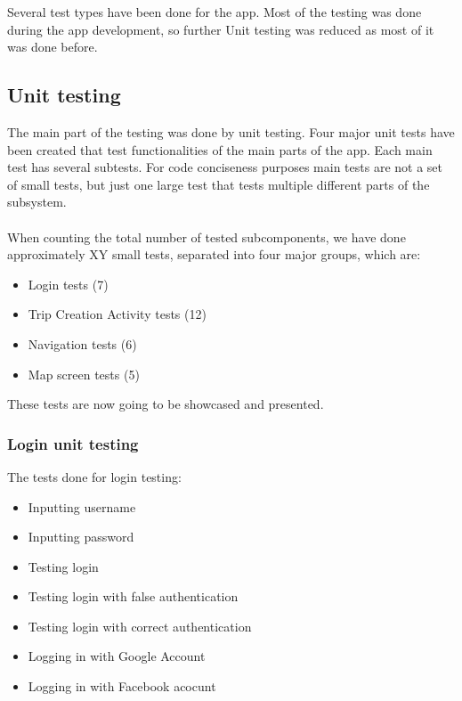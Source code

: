 \hspace{\parindent}Several test types have been done for the app. Most of the testing was done during the app development, so further Unit testing was reduced as most of it was done before.

\subsection{Unit testing}
\hspace{\parindent}The main part of the testing was done by unit testing.
Four major unit tests have been created that test functionalities of the main parts of the app. Each main test has several subtests. For code conciseness purposes main tests are not a set of small tests, but just one large test that tests multiple different parts of the subsystem.\\ \\

When counting the total number of tested subcomponents, we have done approximately XY small tests, separated into four major groups, which are:
\begin{itemize}
\item Login tests (7)
\item Trip Creation Activity tests (12)
\item Navigation tests (6)
\item Map screen tests (5)
\end{itemize}

These tests are now going to be showcased and presented.
\subsubsection{Login unit testing}
The tests done for login testing:
\begin{itemize}
\item Inputting username
\item Inputting password
\item Testing login
\item Testing login with false authentication
\item Testing login with correct authentication
\item Logging in with Google Account
\item Logging in with Facebook acocunt
\end{itemize}

